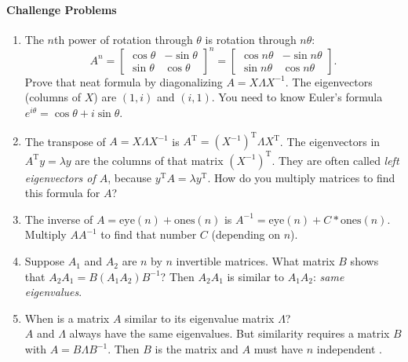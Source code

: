 \documentclass[14pt, a4paper]{article}
\begin{document}
\paragraph{Challenge Problems}
\begin{enumerate}[resume]
    \item The $n$th power of rotation through $\theta$ is rotation through $n\theta$:
          \[
              A^n = \begin{bmatrix} \cos \theta & -\sin \theta \\ \sin \theta & \cos \theta \end{bmatrix}^n = \begin{bmatrix} \cos n\theta & -\sin n\theta \\ \sin n\theta & \cos n\theta \end{bmatrix} .
          \]
          Prove that neat formula by diagonalizing $A = X \Lambda X^{-1}$. The eigenvectors (columns of $X$) are $(1, i)$ and $(i, 1)$. You need to know Euler's formula $e^{i\theta} = \cos \theta + i\sin \theta$.

    \item The transpose of $A = X \Lambda X^{-1}$ is $A^{\mathrm{T}} = (X^{-1})^{\mathrm{T}} \Lambda X^{\mathrm{T}}$. The eigenvectors in $A^{\mathrm{T}} y = \lambda y$ are the columns of that matrix $(X^{-1})^{\mathrm{T}}$. They are often called \textit{left eigenvectors of $A$}, because $y^{\mathrm{T}} A = \lambda y^{\mathrm{T}}$. How do you multiply matrices to find this formula for $A$?
          \begin{center}
          \end{center}

    \item The inverse of $A = \text{eye}(n) + \text{ones}(n)$ is $A^{-1} = \text{eye}(n) + C * \text{ones}(n)$. Multiply $A A^{-1}$ to find that number $C$ (depending on $n$).

    \item Suppose $A_1$ and $A_2$ are $n$ by $n$ invertible matrices. What matrix $B$ shows that $A_2 A_1 = B(A_1 A_2)B^{-1}$? Then $A_2 A_1$ is similar to $A_1 A_2$: \textit{same eigenvalues}.

    \item When is a matrix $A$ similar to its eigenvalue matrix $\Lambda$? \\
          $A$ and $\Lambda$ always have the same eigenvalues. But similarity requires a matrix $B$ with $A = B \Lambda B^{-1}$. Then $B$ is the \underline{\hspace{1cm}} matrix and $A$ must have $n$ independent \underline{\hspace{1cm}} .


\end{enumerate}
\end{document}
